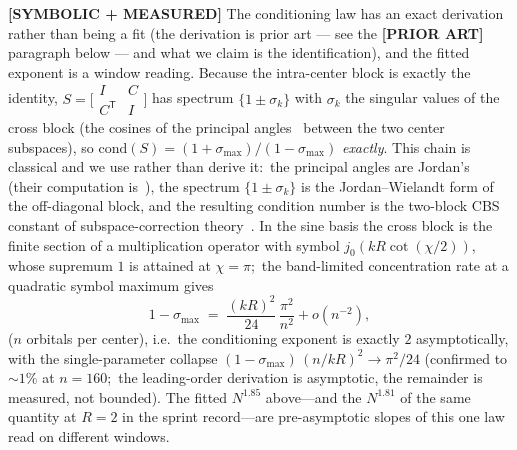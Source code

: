 \documentclass[aps,pra,twocolumn,superscriptaddress,longbibliography]{revtex4-2}
\begin{document}
\textbf{[SYMBOLIC + MEASURED]} The conditioning law has an exact derivation rather than being a fit
(the derivation is prior art --- see the \textbf{[PRIOR ART]} paragraph below ---
and what we claim is the identification), and the fitted exponent is a window
reading.  Because the intra-center block is
exactly the identity, $S=\bigl[\begin{smallmatrix}I&C\\C^{\mathsf T}&I
\end{smallmatrix}\bigr]$ has spectrum $\{1\pm\sigma_k\}$ with $\sigma_k$ the
singular values of the cross block (the cosines of the principal
angles~\cite{amos_hall1961,king1967} between
the two center subspaces), so
$\mathrm{cond}(S)=(1+\sigma_{\max})/(1-\sigma_{\max})$ \emph{exactly}.
This chain is classical and we use rather than derive it:\ the principal angles
are Jordan's~\cite{jordan1875} (their computation
is~\cite{bjorck_golub1973}), the spectrum $\{1\pm\sigma_k\}$ is the
Jordan--Wielandt form of the off-diagonal block, and the resulting condition
number is the two-block CBS constant of subspace-correction
theory~\cite{eijkhout_vassilevski1991}.  In the
sine basis the cross block is the finite section of a multiplication operator
with symbol $j_0\!\left(kR\cot(\chi/2)\right)$, whose supremum $1$ is attained
at $\chi=\pi$;\ the band-limited concentration rate at a quadratic symbol
maximum gives
\begin{equation}
1-\sigma_{\max}\;=\;\frac{(kR)^2}{24}\,\frac{\pi^2}{n^2}+o(n^{-2}),
\label{eq:sigma_law}
\end{equation}
($n$ orbitals per center), i.e.\ the conditioning exponent is exactly $2$
asymptotically, with the single-parameter collapse
$(1-\sigma_{\max})\,(n/kR)^2\to\pi^2/24$ (confirmed to $\sim\!1\%$ at $n=160$;\
the leading-order derivation is asymptotic, the remainder is measured, not
bounded).  The fitted $N^{1.85}$ above---and the $N^{1.81}$ of the same
quantity at $R=2$ in the sprint record---are pre-asymptotic slopes of this one
law read on different windows.
\end{document}

